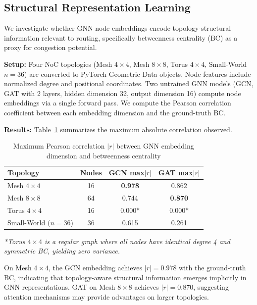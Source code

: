 \documentclass[conference]{IEEEtran}
\begin{document}
\subsection{Structural Representation Learning}
\label{sec:results-correlation}

We investigate whether GNN node embeddings encode topology-structural information relevant to routing, specifically betweenness centrality (BC) as a proxy for congestion potential.

\textbf{Setup:} Four NoC topologies (Mesh $4\times4$, Mesh $8\times8$, Torus $4\times4$, Small-World $n=36$) are converted to PyTorch Geometric Data objects. Node features include normalized degree and positional coordinates. Two untrained GNN models (GCN, GAT with 2 layers, hidden dimension 32, output dimension 16) compute node embeddings via a single forward pass. We compute the Pearson correlation coefficient between each embedding dimension and the ground-truth BC.

\textbf{Results:} Table~\ref{tab:correlation} summarizes the maximum absolute correlation observed.

\begin{table}[h]
\centering
\caption{Maximum Pearson correlation $|r|$ between GNN embedding dimension and betweenness centrality}
\label{tab:correlation}
\small
\begin{tabular}{lccc}
\toprule
\textbf{Topology} & \textbf{Nodes} & \textbf{GCN max$|r|$} & \textbf{GAT max$|r|$} \\
\midrule
Mesh $4\times4$ & 16 & \textbf{0.978} & 0.862 \\
Mesh $8\times8$ & 64 & 0.744 & \textbf{0.870} \\
Torus $4\times4$ & 16 & 0.000* & 0.000* \\
Small-World ($n=36$) & 36 & 0.615 & 0.261 \\
\bottomrule
\end{tabular}
\vspace{2mm}
\small\textit{*Torus $4\times4$ is a regular graph where all nodes have identical degree 4 and symmetric BC, yielding zero variance.}
\end{table}

On Mesh $4\times4$, the GCN embedding achieves $|r| = 0.978$ with the ground-truth BC, indicating that topology-aware structural information emerges implicitly in GNN representations. GAT on Mesh $8\times8$ achieves $|r| = 0.870$, suggesting attention mechanisms may provide advantages on larger topologies.
\end{document}
